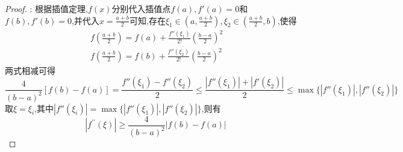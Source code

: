 \documentclass[lang=cn,newtx,10pt,scheme=chinese]{elegantbook}
\begin{document}
\begin{exercise}
\begin{proof}
    {\color{blue} }:
    根据插值定理,$f(x)$分别代入插值点$f(a),f'(a)=0$和$f(b),f'(b)=0$,并代入$x=\frac{a+b}{2}$可知,存在$\xi_1\in(a,\frac{a+b}{2}),\xi_2\in(\frac{a+b}{2},b)$,使得
    \begin{gather}
    f(\frac{a+b}{2})=f(a)+\frac{f''(\xi_1)}{2!}(\frac{b-a}{2})^2
    \nonumber
    \\
    f(\frac{a+b}{2})=f(b)+\frac{f''(\xi_2)}{2!}(\frac{b-a}{2})^2
    \nonumber
    \end{gather}
    两式相减可得
    \begin{equation}
    \frac{4}{(b-a)^2}[f(b)-f(a)]=\frac{f''(\xi_1)-f''(\xi_2)}{2}\leqslant \frac{|f''(\xi_1)|+|f'(\xi_2)|}{2}\leqslant \max\{|f''(\xi_1)|,|f''(\xi_2)|\}
        \nonumber
    \end{equation}
    取$\xi=\xi_i$,其中$|f''(\xi_i)|= \max\{|f''(\xi_1)|,|f''(\xi_2)|\}$,则有
    \begin{equation}
\left| f^{\prime\prime}(\xi ) \right|\ge \frac{4}{(b-a)^2}\left| f(b)-f(a) \right|\
        \nonumber
    \end{equation}
    \end{proof}
\end{exercise}
\end{document}
